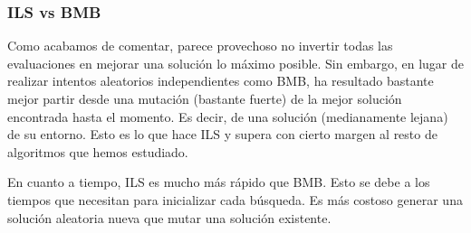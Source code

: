 \documentclass{article}
\begin{document}
\subsubsection*{ILS vs BMB}

Como acabamos de comentar, parece provechoso no invertir todas las evaluaciones en mejorar una solución lo máximo posible.
Sin embargo, en lugar de realizar intentos aleatorios independientes como BMB, ha resultado bastante mejor partir desde
una mutación (bastante fuerte) de la mejor solución encontrada hasta el momento. Es decir, de una solución (medianamente
lejana) de su entorno. Esto es lo que hace ILS y supera con cierto margen al resto de algoritmos que hemos estudiado.

En cuanto a tiempo, ILS es mucho más rápido que BMB. Esto se debe a los tiempos que necesitan para inicializar cada
búsqueda. Es más costoso generar una solución aleatoria nueva que mutar una solución existente.
\end{document}
